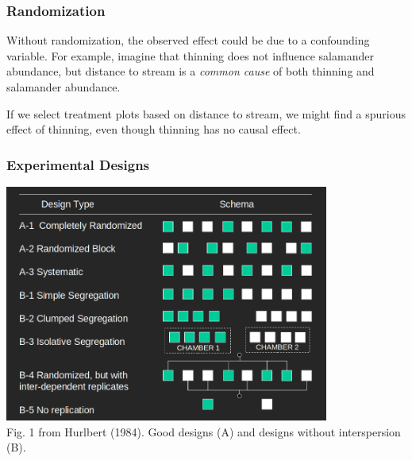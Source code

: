\documentclass[color=usenames,dvipsnames]{beamer}\usepackage[]{graphicx}\usepackage[]{color}
\begin{document}
\begin{frame}
  \frametitle{Randomization}
  \small
  Without randomization, the observed effect could be due to a
  \alert{confounding variable}. For example, imagine that thinning
  does not influence salamander abundance, but \alert{distance to
    stream} is a {\it common cause} of both thinning and salamander
  abundance. \\  
  \vfill
  \begin{center}
 \end{center}
 \pause
 \vfill
 If we select treatment plots based on distance to stream, we might
 find a spurious effect of thinning, even though thinning has no
 causal effect.  
\end{frame}






\begin{frame}
  \frametitle{Experimental Designs}
  \centering
  \includegraphics[width=0.8\textwidth]{Hurlbert-schema} \\
  \vfill
  Fig. 1 from Hurlbert (1984). Good designs (A) and designs without
  interspersion (B). \\
\end{frame}
\end{document}
